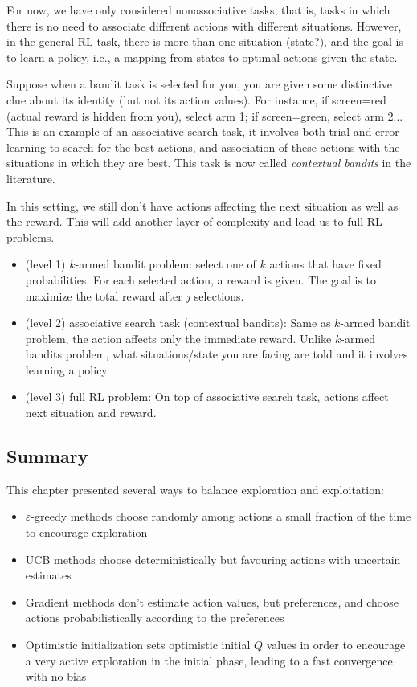 \documentclass[lang=en,mode=geye,device=normal,color=blue,14pt]{elegantnote}
\DeclareMathOperator*{\1}{\mathbbm{1}}
\begin{document}
For now, we have only considered nonassociative tasks, that is, tasks in which there is no need to associate different actions with different situations.
However, in the general RL task, there is more than one situation (state?), and the goal is to learn a policy, i.e., a mapping from states to optimal actions given the state.

Suppose when a bandit task is selected for you, you are given some distinctive clue about its identity (but not its action values). For instance, if screen=red (actual reward is hidden from you), select arm 1; if screen=green, select arm 2... This is an example of an associative search task, it involves both trial-and-error learning to search for the best actions, and association of these actions with the situations in which they are best. This task is now called \textit{contextual bandits} in the literature.

In this setting, we still don't have actions affecting the next situation as well as the reward. This will add another layer of complexity and lead us to full RL problems.

\begin{itemize}
\item (level 1) $k$-armed bandit problem: select one of $k$ actions that have fixed probabilities. For each selected action, a reward is given. The goal is to maximize the total reward after $j$ selections.
\item (level 2) associative search task (contextual bandits): Same as $k$-armed bandit problem, the action affects only the immediate reward. Unlike $k$-armed bandits problem, what situations/state you are facing are told and it involves learning a policy.
\item (level 3) full RL problem: On top of associative search task, actions affect next situation and reward.
\end{itemize}

\subsection{Summary}

This chapter presented several ways to balance exploration and exploitation:

\begin{itemize}
\item $\varepsilon$-greedy methods choose randomly among actions a small fraction of the time to encourage exploration
\item UCB methods choose deterministically but favouring actions with uncertain estimates
\item Gradient methods don't estimate action values, but preferences, and choose actions probabilistically according to the preferences
\item Optimistic initialization sets optimistic initial $Q$ values in order to encourage a very active exploration in the initial phase, leading to a fast convergence with no bias
\end{itemize}
\end{document}
